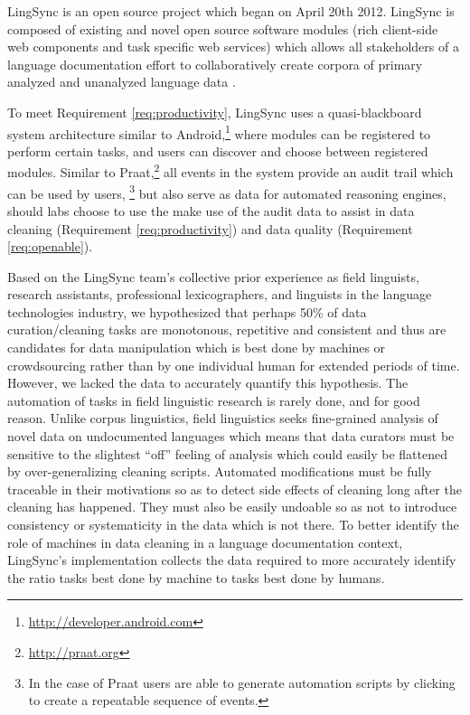 \documentclass[11pt]{article}
\newcommand{\smalltodo}[2][]
    {\todo[caption={#2}, #1]
    {\tiny#2\normalsize}}
\begin{document}
LingSync is an open source project which began on April 20th 2012. 
LingSync is composed of existing and novel open source software modules (rich client-side web
components and task specific web services) which allows all stakeholders of a
language documentation effort to collaboratively create corpora of primary
analyzed and unanalyzed language data \cite{lingsync:2012}.

To meet Requirement \autoref{req:productivity},
LingSync uses a quasi-blackboard system architecture similar to
Android,\footnote{\url{http://developer.android.com}} where modules can be
registered to perform certain tasks, and users can discover and choose between
registered modules. Similar to Praat,\footnote{\url{http://praat.org}}%
all events in the system provide an audit trail which can be used by users,%
\footnote{In the case of Praat users are able to generate automation scripts by clicking to create a repeatable sequence of events.}
but also serve as data for automated reasoning
engines, should labs choose to use the make use of the audit data to assist in data cleaning 
(Requirement \autoref{req:productivity}) and data quality (Requirement \autoref{req:openable}).

Based on the LingSync team's collective prior experience as field linguists, research
assistants, professional lexicographers, and linguists in the language
technologies industry, we hypothesized that perhaps 50\% of data
curation/cleaning tasks are monotonous, repetitive and consistent and thus are
candidates for data manipulation which is best done by machines or
crowdsourcing rather than by one individual human for extended periods of time.
However, we lacked the data to accurately quantify this hypothesis. 
The automation of tasks in field linguistic research is rarely done, and
for good reason. Unlike corpus linguistics, field linguistics seeks
fine-grained analysis of novel data on undocumented languages which means that
data curators must be sensitive to the slightest ``off'' feeling of analysis
which could easily be flattened by over-generalizing cleaning scripts. 
Automated modifications must be fully traceable in their motivations so as to
detect side effects of cleaning long after the cleaning has happened. They must
also be easily undoable so as not to introduce consistency or systematicity in
the data which is not there. %
To better identify the role of machines in data
cleaning in a language documentation context, LingSync's implementation
collects the data required to more accurately identify the ratio tasks best done by machine to tasks best done by humans. 
\end{document}
